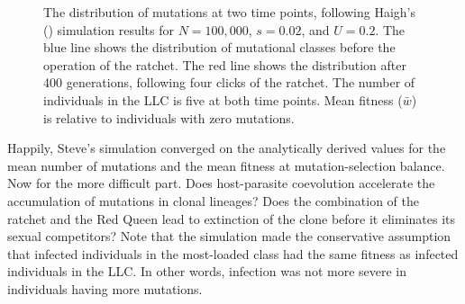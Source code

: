 \documentclass[
  letterpaper,
]{book}
\begin{document}
\begin{figure}


\caption[The distribution of mutations at two time points following
Haigh's simulation results]{\label{fig-6-2}The distribution of mutations
at two time points, following Haigh's ()
simulation results for \(N = 100,000\), \(s = 0.02\), and \(U = 0.2\).
The blue line shows the distribution of mutational classes before the
operation of the ratchet. The red line shows the distribution after 400
generations, following four clicks of the ratchet. The number of
individuals in the LLC is five at both time points. Mean fitness
(\(\bar{w}\)) is relative to individuals with zero mutations.}

\end{figure}%

Happily, Steve's simulation converged on the analytically derived values
for the mean number of mutations and the mean fitness at
mutation-selection balance. Now for the more difficult part. Does
host-parasite coevolution accelerate the accumulation of mutations in
clonal lineages? Does the combination of the ratchet and the Red Queen
lead to extinction of the clone before it eliminates its sexual
competitors? Note that the simulation made the conservative assumption
that infected individuals in the most-loaded class had the same fitness
as infected individuals in the LLC. In other words, infection was not
more severe in individuals having more mutations.
\end{document}
